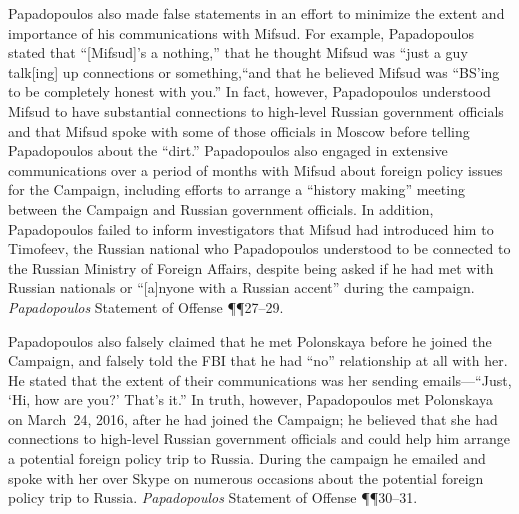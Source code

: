Papadopoulos also made false statements in an effort to minimize the extent and importance of his communications with Mifsud.
For example, Papadopoulos stated that ``[Mifsud]'s a nothing,'' that he thought Mifsud was ``just a guy talk[ing] up connections or something,``and that he believed Mifsud was ``BS'ing to be completely honest with you.''
In fact, however, Papadopoulos understood Mifsud to have substantial connections to high-level Russian government officials and that Mifsud spoke with some of those officials in Moscow before telling Papadopoulos about the ``dirt.''
Papadopoulos also engaged in extensive communications over a period of months with Mifsud about foreign policy issues for the Campaign, including efforts to arrange a ``history making'' meeting between the Campaign and Russian government officials.
In addition, Papadopoulos failed to inform investigators that Mifsud had introduced him to Timofeev, the Russian national who Papadopoulos understood to be connected to the Russian Ministry of Foreign Affairs, despite being asked if he had met with Russian nationals or ``[a]nyone with a Russian accent'' during the campaign.
\textit{Papadopoulos} Statement of Offense \P\P 27--29.

Papadopoulos also falsely claimed that he met Polonskaya before he joined the Campaign, and falsely told the FBI that he had ``no'' relationship at all with her.
He stated that the extent of their communications was her sending emails---``Just, `Hi, how are you?' That's it.''
In truth, however, Papadopoulos met Polonskaya on March~24, 2016, after he had joined the Campaign; he believed that she had connections to high-level Russian government officials and could help him arrange a potential foreign policy trip to Russia.
During the campaign he emailed and spoke with her over Skype on numerous occasions about the potential foreign policy trip to Russia.
\textit{Papadopoulos} Statement of Offense \P\P 30--31.

